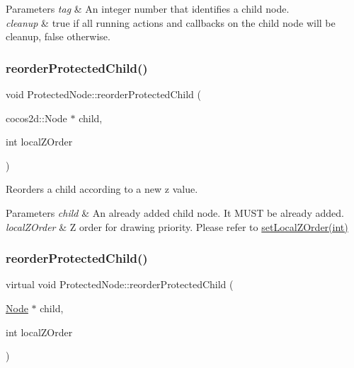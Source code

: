 \begin{DoxyParams}{Parameters}
{\em tag} & An integer number that identifies a child node. \\
\hline
{\em cleanup} & true if all running actions and callbacks on the child node will be cleanup, false otherwise. \\
\hline
\end{DoxyParams}
\mbox{\label{classProtectedNode_a6386f04b4d8b7a3e12c65b455d6bcf38}} 
\subsubsection{\texorpdfstring{reorder\+Protected\+Child()}{reorderProtectedChild()}\hspace{0.1cm}{\footnotesize\ttfamily [1/2]}}
{\footnotesize\ttfamily void Protected\+Node\+::reorder\+Protected\+Child (\begin{DoxyParamCaption}\item[{cocos2d\+::\+Node $\ast$}]{child,  }\item[{int}]{local\+Z\+Order }\end{DoxyParamCaption})\hspace{0.3cm}{\ttfamily [virtual]}}

Reorders a child according to a new z value.


\begin{DoxyParams}{Parameters}
{\em child} & An already added child node. It M\+U\+ST be already added. \\
\hline
{\em local\+Z\+Order} & Z order for drawing priority. Please refer to \hyperlink{classNode_aee4e616c2d55b722226aae1e68b4946f}{set\+Local\+Z\+Order(int)} \\
\hline
\end{DoxyParams}
\mbox{\label{classProtectedNode_af208be19b66a59e33760f6f4075154f4}} 
\subsubsection{\texorpdfstring{reorder\+Protected\+Child()}{reorderProtectedChild()}\hspace{0.1cm}{\footnotesize\ttfamily [2/2]}}
{\footnotesize\ttfamily virtual void Protected\+Node\+::reorder\+Protected\+Child (\begin{DoxyParamCaption}\item[{\hyperlink{classNode}{Node} $\ast$}]{child,  }\item[{int}]{local\+Z\+Order }\end{DoxyParamCaption})\hspace{0.3cm}{\ttfamily [virtual]}}


